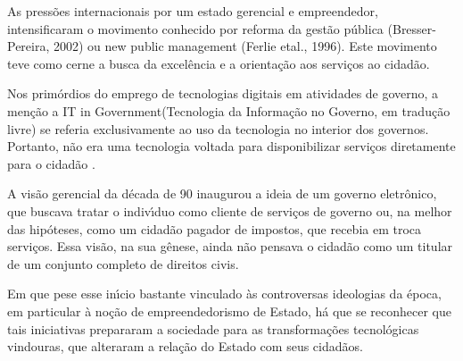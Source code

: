\documentclass[
12pt,		%
openright,	%
twoside,  %
a4paper,			%
chapter=TITLE,		%
english,			%
french,				%
spanish,			%
brazil				%
]{USPSC-classe/USPSC}
\begin{document}
As press\~oes internacionais por um estado gerencial e empreendedor, intensificaram o movimento conhecido por reforma da gest\~ao p\'ublica (Bresser-Pereira, 2002) ou new public management (Ferlie etal., 1996). Este movimento teve como cerne a busca da excel\^encia e a orienta\c{c}\~ao aos servi\c{c}os ao cidad\~ao.

















Nos prim\'ordios do emprego de tecnologias digitais em atividades de governo, a men\c{c}\~ao a \textquotedbl IT in Government\textquotedbl  (Tecnologia da Informa\c{c}\~ao no Governo, em tradu\c{c}\~ao livre) se referia exclusivamente ao uso da tecnologia no interior dos governos. Portanto, n\~ao era uma tecnologia voltada para disponibilizar servi\c{c}os diretamente para o cidad\~ao .

















A vis\~ao gerencial da d\'ecada de 90 inaugurou a ideia de um \textquotedbl governo eletr\^onico\textquotedbl , que buscava tratar o indiv\'{\i}duo como \textquotedbl  cliente \textquotedbl  de servi\c{c}os de governo ou, na melhor das hip\'oteses, como um cidad\~ao \textquotedbl pagador de impostos\textquotedbl , que recebia em troca servi\c{c}os. Essa vis\~ao, na sua g\^enese, ainda n\~ao pensava o cidad\~ao como um titular de um conjunto completo de direitos civis.

















Em que pese esse in\'{\i}cio bastante vinculado \`as controversas ideologias da \'epoca, em particular \`a no\c{c}\~ao de \textquotedbl empreendedorismo de Estado\textquotedbl , h\'a que se reconhecer que tais iniciativas prepararam a sociedade para as transforma\c{c}\~oes tecnol\'ogicas vindouras, que alteraram a rela\c{c}\~ao do Estado com seus cidad\~aos.
\end{document}

